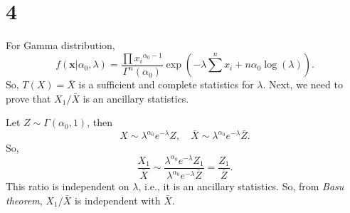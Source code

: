 \documentclass[en,12pt]{elegantpaper}
\begin{document}
    \section*{4}
    \noindent For Gamma distribution, 
    \[
        f(\mathbf{x}|\alpha_0, \lambda)=\frac{\prod{x_i}^{\alpha_0-1}}{\Gamma^n(\alpha_0)}\exp\left(-\lambda\sum^n x_i+n\alpha_0\log(\lambda)\right). 
    \]
    So, $T(X)=\bar{X}$ is a sufficient and complete statistics for $\lambda$. Next, we need to prove that $X_1/\bar{X}$ is an ancillary statistics. 

    Let $Z\sim\Gamma(\alpha_0, 1)$, then 
    \[
        X\sim\lambda^{\alpha_0}e^{-\lambda}Z, \quad \bar{X}\sim \lambda^{\alpha_0}e^{-\lambda}\bar{Z}. 
    \]
    So, 
    \[
        \frac{X_1}{\bar{X}}\sim\frac{\lambda^{\alpha_0}e^{-\lambda}Z_1}{\lambda^{\alpha_0}e^{-\lambda}\bar{Z}}=\frac{Z_1}{\bar{Z}}. 
    \]
    This ratio is independent on $\lambda$, i.e., it is an ancillary statistics. So, from \emph{Basu theorem}, $X_1/\bar{X}$ is independent with $\bar{X}$. 
\end{document}
